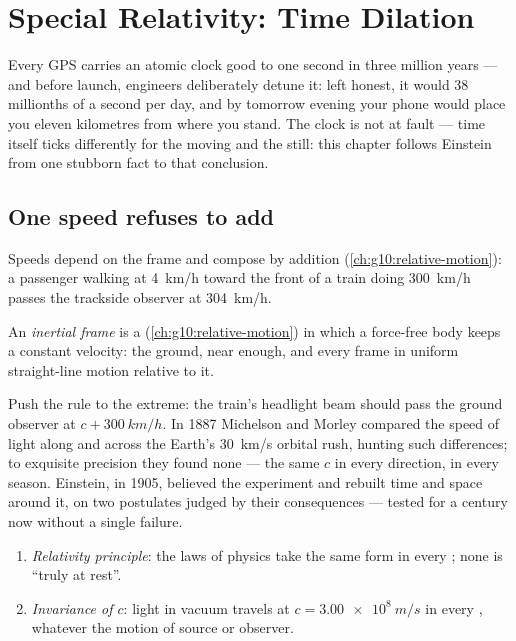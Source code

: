 \chapter{Special Relativity: Time Dilation}\label{ch:g12:special-relativity}

Every GPS  carries an atomic clock good to one second in three
million years --- and before launch, engineers deliberately detune it: left
honest, it would  38 millionths of a second per day, and by tomorrow
evening your phone would place you eleven kilometres from where you stand.
The clock is not at fault --- time itself ticks differently for the moving and
the still: this chapter follows Einstein from one stubborn fact to that conclusion.

\section{One speed refuses to add}

Speeds depend on the frame and compose by addition
(\cref{ch:g10:relative-motion}): a passenger walking at \qty{4}{km/h} toward the
front of a train doing \qty{300}{km/h} passes the trackside observer at \qty{304}{km/h}.

\begin{definition}\label{def:g12:special-relativity:inertial}
An \emph{inertial frame} is a 
(\cref{ch:g10:relative-motion}) in which a force-free body keeps a constant
velocity: the ground, near enough, and every frame in uniform
straight-line motion relative to it.
\end{definition}

Push the rule to the extreme: the train's headlight beam should pass the
ground observer at $c + \qty{300}{km/h}$. In 1887 Michelson and Morley
compared the speed of light along and across the Earth's \qty{30}{km/s}
orbital rush, hunting such differences; to exquisite precision they found
none --- the same $c$ in every direction, in every season. Einstein, in 1905,
believed the experiment and rebuilt time and space around it, on two postulates
judged by their consequences --- tested for a century now without a single failure.

\begin{theorem}\label{thm:g12:special-relativity:postulates}
\begin{enumerate}
  \item \emph{Relativity principle}: the laws of physics take the same
        form in every ; none is ``truly at rest''.
  \item \emph{Invariance of $c$}: light in vacuum travels at
        $c = \qty{3.00e8}{m/s}$ in every , whatever the
        motion of source or observer.
\end{enumerate}
\end{theorem}
\admitted


